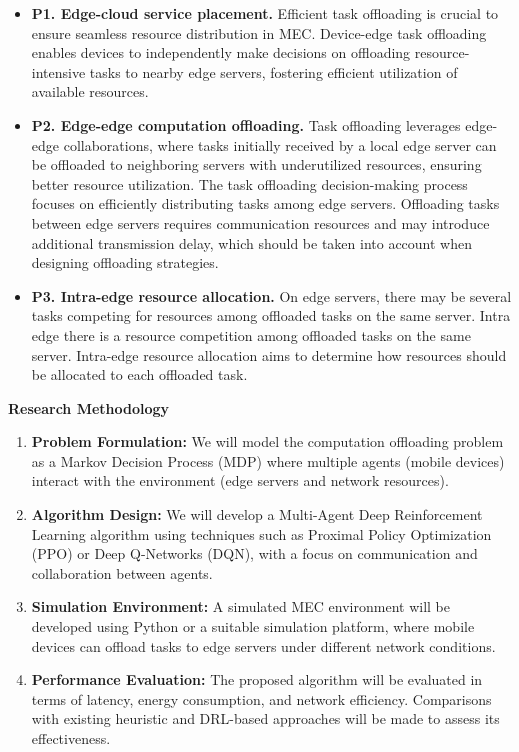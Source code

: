 \documentclass[12pt]{article}
\begin{document}
\begin{itemize}
	
	\item \textbf{P1. Edge-cloud service placement.}
	Efficient task offloading is crucial to ensure seamless resource distribution in MEC. Device-edge task offloading enables devices to independently make decisions on offloading resource-intensive tasks to nearby edge servers, fostering efficient utilization of available resources.
	
	\item\textbf{P2. Edge-edge computation offloading.} 
	Task offloading leverages edge-edge collaborations, where tasks initially received by a local edge server can be offloaded to neighboring servers with underutilized resources, ensuring better resource utilization. The task offloading decision-making process focuses on efficiently distributing tasks among edge servers. Offloading tasks between edge servers requires communication resources and may introduce additional transmission delay, which should be taken into account when designing offloading strategies.
	
	\item\textbf{P3. Intra-edge resource allocation.} On edge servers, there may be several tasks competing for resources among offloaded tasks on the same server. Intra edge there is a resource competition among offloaded tasks on the same server. Intra-edge resource allocation aims to determine how resources should be allocated to each offloaded task.
	
\end{itemize}

\vspace{5mm}

\noindent\textbf{\large Research Methodology}

\begin{enumerate} \item \textbf{Problem Formulation:} We will model the computation offloading problem as a Markov Decision Process (MDP) where multiple agents (mobile devices) interact with the environment (edge servers and network resources). \item \textbf{Algorithm Design:} We will develop a Multi-Agent Deep Reinforcement Learning algorithm using techniques such as Proximal Policy Optimization (PPO) or Deep Q-Networks (DQN), with a focus on communication and collaboration between agents. \item \textbf{Simulation Environment:} A simulated MEC environment will be developed using Python or a suitable simulation platform, where mobile devices can offload tasks to edge servers under different network conditions. \item \textbf{Performance Evaluation:} The proposed algorithm will be evaluated in terms of latency, energy consumption, and network efficiency. Comparisons with existing heuristic and DRL-based approaches will be made to assess its effectiveness. \end{enumerate}
\end{document}
